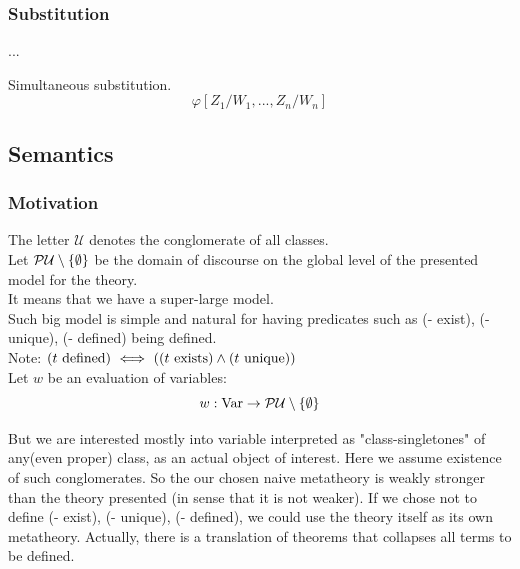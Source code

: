 \subsubsection{Substitution}%
...
\begin{definition} Simultaneous substitution.
\[
\varphi[Z_1/W_1,...,Z_n/W_n]
\]
\end{definition}
\noindent













\pagebreak
\subsection{Semantics} %
\subsubsection{Motivation}
The letter $\mathcal{U}$ denotes the conglomerate of all classes.\\

Let $\mathcal{P} \mathcal{U}\setminus\{\emptyset\}$ be the domain of discourse on the global level of the presented model for the theory.\\


It means that we have a super-large model.\\
Such big model is simple and natural for having predicates such as (- exist), (- unique), (- defined) being defined.\\
Note: $(t\mathrm{\ defined})\ \Longleftrightarrow\  ((t\mathrm{\ exists})\land(t\mathrm{\ unique}))$\\


Let $w$ be an evaluation of variables:\\
\[
w:\mathrm{Var}\to \mathcal{P} \mathcal{U}\setminus\{\emptyset\}
\]

But we are interested mostly into variable interpreted as "class-singletones" of any(even proper) class, as an actual object of interest.
Here we assume existence of such conglomerates. So the our chosen naive metatheory is weakly stronger than the theory presented (in sense that it is not weaker). If we chose not to define (- exist), (- unique), (- defined), we could use the theory itself as its own metatheory. Actually, there is a translation of theorems that collapses all terms to be defined.

